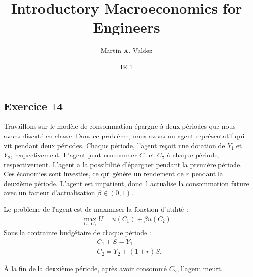 \documentclass[11pt]{article}
\title{Introductory Macroeconomics for Engineers}
\author{Martin A. Valdez}
\date{IE 1}
\begin{document}
\maketitle
\subsection*{Exercice 14}
Travaillons sur le modèle de consommation-épargne à deux périodes que nous avons discuté en classe.
Dans ce problème, nous avons un agent représentatif qui vit pendant deux périodes.
Chaque période, l'agent reçoit une dotation de \(Y_1\) et \(Y_2\), respectivement.
L'agent peut consommer \(C_1\) et \(C_2\) à chaque période, respectivement.
L'agent a la possibilité d'épargner pendant la première période.
Ces économies sont investies, ce qui génère un rendement de \(r\) pendant la deuxième période.
L'agent est impatient, donc il actualise la consommation future avec un facteur d'actualisation \(\beta \in (0,1)\).

Le problème de l'agent est de maximiser la fonction d'utilité :
\begin{align*}
    \max_{ C_1, C_2} U = u(C_1) + \beta u(C_2)
\end{align*}
Sous la contrainte budgétaire de chaque période :
\begin{align*}
    & C_1 + S = Y_1
    \\
    & C_2 = Y_2 + (1 + r)S.
\end{align*}

À la fin de la deuxième période, après avoir consommé \(C_2\), l'agent meurt.
\end{document}
